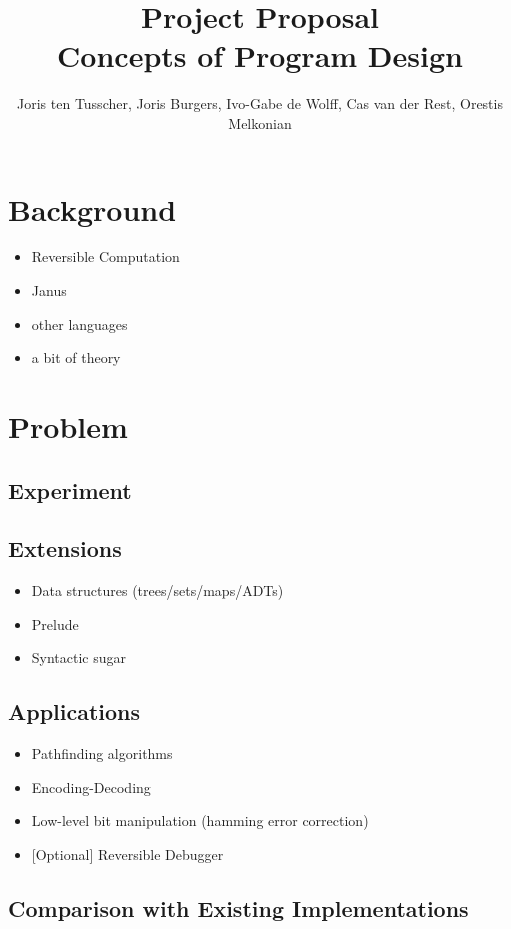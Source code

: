 \documentclass[12pt,a4paper]{article}
\title{\textbf{Project Proposal \\ \small{Concepts of Program Design}}}
\author{\small{Joris ten Tusscher, Joris Burgers, Ivo-Gabe de Wolff, Cas van der Rest, Orestis Melkonian}}
\date{}
\begin{document}
\maketitle

\section{Background}
\begin{itemize}
	\item{Reversible Computation}
	\item{Janus}
	\item{other languages}
	\item{a bit of theory}
\end{itemize}

\section{Problem}
	\subsection{Experiment}
	
	\subsection{Extensions}
	\begin{itemize}
		\item{Data structures (trees/sets/maps/ADTs)}
		\item{Prelude}
		\item{Syntactic sugar}
	\end{itemize}
	
	\subsection{Applications}
	\begin{itemize}
		\item{Pathfinding algorithms}
        \item{Encoding-Decoding}
        \item{Low-level bit manipulation (hamming error correction)}
        \item{[Optional] Reversible Debugger}
	\end{itemize}
	
	\subsection{Comparison with Existing Implementations}
\end{document}
